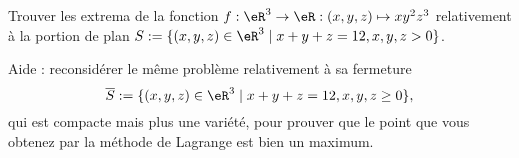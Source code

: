 
\begin{exercice}\label{exoVariete0003}

Trouver les extrema de la fonction $f: \eR^3 \rightarrow \eR: (x,y,z) 
\mapsto xy^2z^3$ relativement à la portion de plan $S:= \{ (x,y,z) 
\in \eR^3 \mid x+y+z =12, x,y,z>0 \}$.

Aide : reconsidérer le même problème relativement à sa fermeture 
\[ 
\overline{S} := \{ (x,y,z) \in \eR^3 \mid x+y+z =12, x,y,z \geq 0 \},
\]
qui est compacte mais plus une variété, pour prouver que le point que vous obtenez par la méthode de Lagrange est bien un maximum.


\end{exercice}
